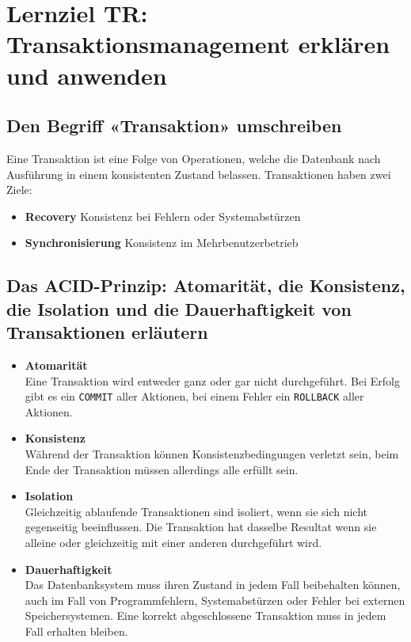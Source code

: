 \section{Lernziel TR: Transaktionsmanagement erklären und anwenden}

\subsection{Den Begriff «Transaktion» umschreiben}
Eine Transaktion ist eine Folge von Operationen, welche die Datenbank nach Ausführung in einem konsistenten Zustand belassen. Transaktionen haben zwei Ziele:

\begin{itemize}
  \item \textbf{Recovery}
  Konsistenz bei Fehlern oder Systemabstürzen
  \item \textbf{Synchronisierung}
  Konsistenz im Mehrbenutzerbetrieb
\end{itemize}

\subsection{Das ACID-Prinzip: Atomarität, die Konsistenz, die Isolation und die Dauerhaftigkeit von Transaktionen erläutern}

\begin{itemize}
  \item \textbf{Atomarität} \\
  Eine Transaktion wird entweder ganz oder gar nicht durchgeführt. Bei Erfolg gibt es ein \texttt{COMMIT} aller Aktionen, bei einem Fehler ein \texttt{ROLLBACK} aller Aktionen.
  \item \textbf{Konsistenz} \\
  Während der Transaktion können Konsistenzbedingungen verletzt sein, beim Ende der Transaktion müssen allerdings alle erfüllt sein.
  \item \textbf{Isolation} \\
  Gleichzeitig ablaufende Transaktionen sind isoliert, wenn sie sich nicht gegenseitig beeinflussen. Die Transaktion hat dasselbe Resultat wenn sie alleine oder gleichzeitig mit einer anderen durchgeführt wird.
  \item \textbf{Dauerhaftigkeit} \\
  Das Datenbanksystem muss ihren Zustand in jedem Fall beibehalten können, auch im Fall von Programmfehlern, Systemabstürzen oder Fehler bei externen Speichersystemen. Eine korrekt abgeschlossene Transaktion muss in jedem Fall erhalten bleiben.
\end{itemize}

